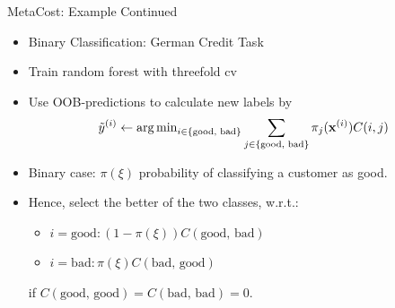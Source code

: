 \documentclass[11pt,compress,t,notes=noshow, xcolor=table]{beamer}
\begin{document}
\begin{vbframe}{MetaCost: Example Continued}


        \begin{itemize}
            \item Binary Classification: German Credit Task                     
            \item Train random forest with threefold cv
            \item Use OOB-predictions to calculate new labels by
            \begin{equation*}
                \tilde y^{(i)} \leftarrow \operatorname{arg\,min}_{i \in \{\text{good, bad}\}} \sum_{j \in \{\text{good, bad}\}} \pi_j(\mathbf{x}^{(i)}) C(i,j)
            \end{equation*}
            \item Binary case: $\pi(\xi)$ probability of classifying a customer as good.
            \item Hence, select the better of the two classes, w.r.t.:
             \begin{itemize}
               \item $i = \text{good}: (1-\pi(\xi)) C(\text{good, bad})$
               \vspace{5pt}
               \item $i = \text{bad}: \pi(\xi) C(\text{bad, good})$
               \vspace{5pt}
             \end{itemize}
               \vspace{5pt}
            if $C(\text{good, good}) = C(\text{bad, bad}) = 0$.
        \end{itemize}

\end{vbframe}



%
\endlecture
\end{document}

